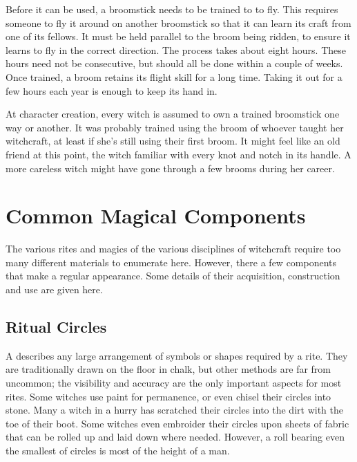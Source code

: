 Before it can be used, a broomstick needs to be trained to to fly.
This requires someone to fly it around on another broomstick so that it can learn its craft from one of its fellows.
It must be held parallel to the broom being ridden, to ensure it learns to fly in the correct direction.
The process takes about eight hours.
These hours need not be consecutive, but should all be done within a couple of weeks.
Once trained, a broom retains its flight skill for a long time.
Taking it out for a few hours each year is enough to keep its hand in.

At character creation, every witch is assumed to own a trained broomstick one way or another.
It was probably trained using the broom of whoever taught her witchcraft, at least if she's still using their first broom.
It might feel like an old friend at this point, the witch familiar with every knot and notch in its handle.
A more careless witch might have gone through a few brooms during her career.



\section{Common Magical Components}

The various rites and magics of the various disciplines of witchcraft require too many different materials to enumerate here.
However, there a few components that make a regular appearance.
Some details of their acquisition, construction and use are given here.

\subsection{Ritual Circles}

A  describes any large arrangement of symbols or shapes required by a rite.
They are traditionally drawn on the floor in chalk, but other methods are far from uncommon; the visibility and accuracy are the only important aspects for most rites.
Some witches use paint for permanence, or even chisel their circles into stone.
Many a witch in a hurry has scratched their circles into the dirt with the toe of their boot.
Some witches even embroider their circles upon sheets of fabric that can be rolled up and laid down where needed.
However, a roll bearing even the smallest of circles is most of the height of a man.

